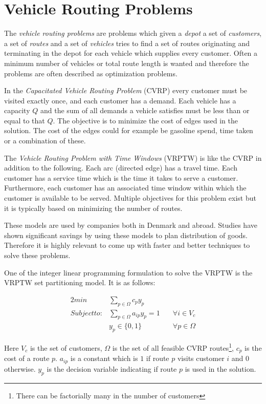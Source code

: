 \section{Vehicle Routing Problems}
The \textit{vehicle routing problems} are problems which given a \textit{depot} a set of \textit{customers}, a set of \textit{routes} and a set of \textit{vehicles} tries to find a set of routes originating and terminating in the depot for each vehicle which supplies every customer. Often a minimum number of vehicles or total route length is wanted and therefore the problems are often described as optimization problems. 

In the \textit{Capacitated Vehicle Routing Problem} (CVRP) every customer must be visited exactly once, and each customer has a demand. Each vehicle has a capacity $Q$ and the sum of all demands a vehicle satisfies must be less than or equal to that $Q$. The objective is to minimize the cost of edges used in the solution. The cost of the edges could for example be gasoline spend, time taken or a combination of these. 

The \textit{Vehicle Routing Problem with Time Windows} (VRPTW) is like the CVRP in addition to the following. Each arc (directed edge) has a travel time. Each customer has a service time which is the time it takes to serve a customer. Furthermore, each customer has an associated time window within which the customer is available to be served. Multiple objectives for this problem exist but it is typically based on minimizing the number of routes.

\newpar These models are used by companies both in Denmark and abroad. Studies have shown significant savings by using these models to plan distribution of goods. Therefore it is highly relevant to come up with faster and better techniques to solve these problems.

\newpar One of the integer linear programming formulation to solve the VRPTW is the VRPTW set partitioning model. It is as follows:

\begin{alignat}{2}
min         & \sum_{p\in \Omega} c_p y_p \\
Subject to: & \sum_{p \in \Omega} a_{ip} y_p = 1 \quad  & \forall i \in V_c \\
            & y_p \in \{0,1\}                           & \forall p \in \Omega
\end{alignat}

Here $V_c$ is the set of customers, $\Omega$ is the set of all feasible CVRP routes\footnote{There can be factorially many in the number of customers}, $c_p$ is the cost of a route $p$. $a_{ip}$ is a constant which is $1$ if route $p$ visits customer $i$ and $0$ otherwise. $y_p$ is the decision variable indicating if route $p$ is used in the solution. 

